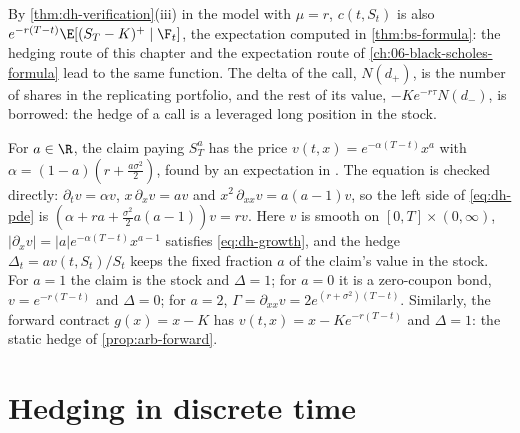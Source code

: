 By \cref{thm:dh-verification}(iii) in the model with $\mu=r$, $c(t,S_t)$ is also
$e^{-r(T-t)}\E[(S_T-K)^+\mid\F_t]$, the expectation computed in \cref{thm:bs-formula}: the
hedging route of this chapter and the expectation route of \cref{ch:06-black-scholes-formula}
lead to the same function. The delta of the call, $N(d_+)$, is the number of shares in the
replicating portfolio, and the rest of its value, $-Ke^{-r\tau}N(d_-)$, is borrowed: the
hedge of a call is a leveraged long position in the stock.

\begin{example}\label{exa:dh-power}
For $a\in\R$, the claim paying $S_T^a$ has the price $v(t,x)=e^{-\alpha(T-t)}x^a$ with
$\alpha=(1-a)(r+\frac{a\sigma^2}{2})$, found by an expectation in
. The equation is checked directly: $\partial_tv=\alpha v$,
$x\,\partial_xv=av$ and $x^2\,\partial_{xx}v=a(a-1)v$, so the left side of \eqref{eq:dh-pde} is
$(\alpha+ra+\frac{\sigma^2}{2}a(a-1))v=rv$. Here $v$ is smooth on $[0,T]\times(0,\infty)$,
$|\partial_xv|=|a|e^{-\alpha(T-t)}x^{a-1}$ satisfies \eqref{eq:dh-growth}, and the hedge
$\Delta_t=av(t,S_t)/S_t$ keeps the fixed fraction $a$ of the claim's value in the stock. For
$a=1$ the claim is the stock and $\Delta=1$; for $a=0$ it is a zero-coupon bond,
$v=e^{-r(T-t)}$ and $\Delta=0$; for $a=2$, $\Gamma=\partial_{xx}v=2e^{(r+\sigma^2)(T-t)}$.
Similarly, the forward contract $g(x)=x-K$ has $v(t,x)=x-Ke^{-r(T-t)}$ and $\Delta=1$: the static
hedge of \cref{prop:arb-forward}.
\end{example}


\section{Hedging in discrete time}\label{sec:dh-discrete}

